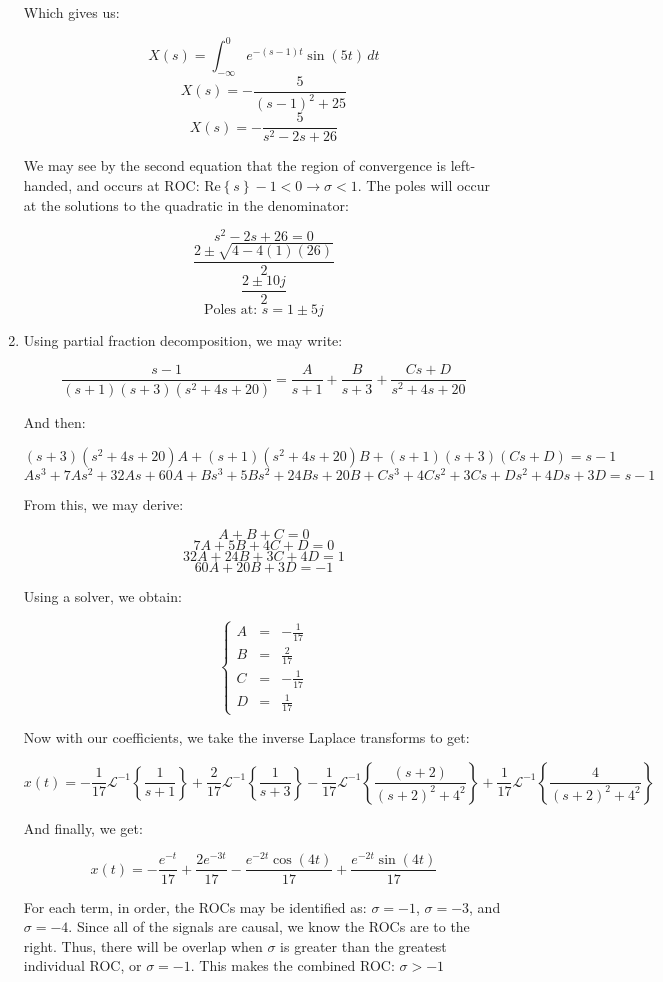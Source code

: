 \begin{enumerate}
    Which gives us:

    $$X(s)=\int_{-\infty}^{0}e^{-(s-1)t}\sin(5t)\,dt$$
    $$X(s)=-\frac{5}{(s-1)^2+25}$$
    $$\boxed{X(s)=-\frac{5}{s^2-2s+26}}$$

    We may see by the second equation that the region of convergence is left-handed, and occurs at $\boxed{\text{ROC: }\text{Re}\left\{s\right\}-1<0\longrightarrow \sigma <1}$. The poles will occur at the solutions to the quadratic in the denominator:

    $$s^2-2s+26=0$$
    $$\frac{2\pm\sqrt{4-4(1)(26)}}{2}$$
    $$\frac{2\pm10j}{2}$$
    $$\boxed{\text{Poles at: }s=1\pm 5j}$$

  \item

    Using partial fraction decomposition, we may write:

    $$\frac{s-1}{(s+1)(s+3)(s^2+4s+20)}=\frac{A}{s+1}+\frac{B}{s+3}+\frac{Cs+D}{s^2+4s+20}$$

    And then:

    $$(s+3)(s^2+4s+20)A+(s+1)(s^2+4s+20)B+(s+1)(s+3)(Cs+D)=s-1$$
    $$As^3+7As^2+32As+60A+Bs^3+5Bs^2+24Bs+20B+Cs^3+4Cs^2+3Cs+Ds^2+4Ds+3D=s-1$$

    From this, we may derive:

    $$A+B+C=0$$
    $$7A+5B+4C+D=0$$
    $$32A+24B+3C+4D=1$$
    $$60A+20B+3D=-1$$

    Using a solver, we obtain:

    $$\left\{\begin{array}{lll} A&=& -\frac{1}{17}\\B&=&\frac{2}{17} \\C&=&-\frac{1}{17} \\D&=&\frac{1}{17} \end{array}$$

      Now with our coefficients, we take the inverse Laplace transforms to get:

      $$x(t)=-\frac{1}{17}\mathcal{L}^{-1}\left\{ \frac{1}{s+1} \right\}+\frac{2}{17}\mathcal{L}^{-1}\left\{ \frac{1}{s+3} \right\}-\frac{1}{17}\mathcal{L}^{-1}\left\{ \frac{(s+2)}{(s+2)^2+4^2} \right\}+\frac{1}{17}\mathcal{L}^{-1}\left\{ \frac{4}{(s+2)^2+4^2} \right\}$$

      And finally, we get:

      $$\boxed{x(t)=-\frac{e^{-t}}{17}+\frac{2e^{-3t}}{17}-\frac{e^{-2t}\cos(4t)}{17}+\frac{e^{-2t}\sin(4t)}{17}}$$

      For each term, in order, the ROCs may be identified as: $\sigma=-1$, $\sigma=-3$, and $\sigma=-4$. Since all of the signals are causal, we know the ROCs are to the right. Thus, there will be overlap when $\sigma$ is greater than the greatest individual ROC, or $\sigma=-1$. This makes the combined ROC: $\boxed{\sigma > -1}$


\end{enumerate}
